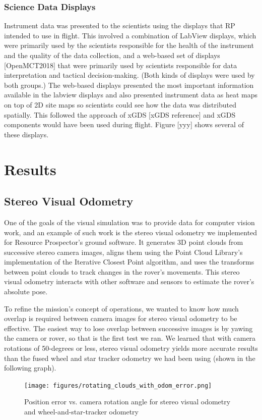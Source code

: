 \documentclass[twocolumn,letterpaper]{IEEEAerospaceCLS}  %
\begin{document}
\subsubsection{Science Data Displays}
Instrument data was presented to the scientists using the displays that RP intended to use in flight.  This involved a combination of LabView displays, which were primarily used by the scientists responsible for the health of the instrument and the quality of the data collection, and a web-based set of displays [OpenMCT2018] that were primarily used by scientists responsible for data interpretation and tactical decision-making.  (Both kinds of displays were used by both groups.)  The web-based displays presented the most important information available in the labview displays and also presented instrument data as heat maps on top of 2D site maps so scientists could see how the data was distributed spatially.  This followed the approach of xGDS [xGDS reference] and xGDS components would have been used during flight.  Figure [yyy] shows several of these displays.

\section{Results}

\subsection{Stereo Visual Odometry}
One of the goals of the visual simulation was to provide data for computer vision work, and an example of such work is the stereo visual odometry we implemented for Resource Prospector's ground software.
It generates 3D point clouds from successive stereo camera images, aligns them using the Point Cloud Library's implementation of the Iterative Closest Point algorithm, and uses the transforms between point clouds to track changes in the rover's movements.
This stereo visual odometry interacts with other software and sensors to estimate the rover's absolute pose.

To refine the mission's concept of operations, we wanted to know how much overlap is required between camera images for stereo visual odometry to be effective. 
The easiest way to lose overlap between successive images is by yawing the camera or rover, so that is the first test we ran. 
We learned that with camera rotations of 50-degrees or less, stereo visual odometry yields more accurate results than the fused wheel and star tracker odometry we had been using (shown in the following graph).
\begin{figure}[h!]
	\texttt{[image: figures/rotating\_clouds\_with\_odom\_error.png]}
    \caption{Position error vs. camera rotation angle for stereo visual odometry and wheel-and-star-tracker odometry}
\end{figure}
\end{document}
